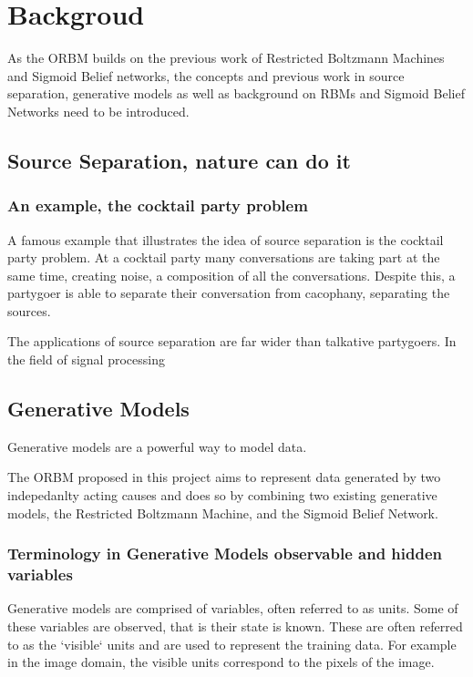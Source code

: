 \chapter{Backgroud}

 As the ORBM builds on the previous work of Restricted Boltzmann Machines and Sigmoid Belief networks, the concepts and previous work in source separation, generative models as well as background on RBMs and Sigmoid Belief Networks need to be introduced.

\section{Source Separation, nature can do it}

\subsection{An example, the cocktail party problem}
A famous example that illustrates the idea of source separation is the cocktail party problem. At a cocktail party many conversations are taking part at the same time, creating noise, a composition of all the conversations. Despite this, a partygoer is able to separate their conversation from cacophany, separating the sources.

The applications of source separation are far wider than talkative partygoers. In the field of signal processing
\todo%

\section{Generative Models}

Generative models are a powerful way to model data.

The ORBM proposed in this project aims to represent data generated by two indepedanlty acting causes and does so by combining two existing generative models, the Restricted Boltzmann Machine, and the Sigmoid Belief Network.

\subsection{Terminology in Generative Models observable and hidden variables}

Generative models are comprised of variables, often referred to as units. Some of these variables are observed, that is their state is known. These are often referred to as the `visible` units and are used to represent the training data. For example in the image domain, the visible units correspond to the pixels of the image.

